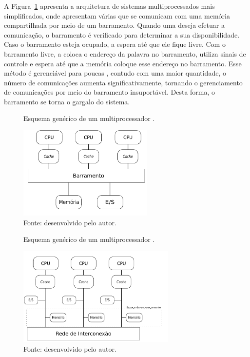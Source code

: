 A Figura~\ref{fig:uma} apresenta a arquitetura de sistemas multiprocessados \uma
mais simplificados, onde apresentam várias \cpus que se
comunicam com uma memória compartilhada por meio de um barramento. Quando uma
\cpu deseja efetuar a comunicação, o barramento é verificado para
determinar a sua disponibilidade. Caso o barramento esteja ocupado, a
\cpu espera até que ele fique livre. Com o barramento livre, a \cpu
coloca o endereço da palavra no barramento, utiliza sinais de
controle e espera até que a memória coloque esse endereço no barramento. Esse
método é gerenciável para poucas \cpus, contudo com uma maior quantidade, o
número de comunicações aumenta significativamente, tornando
o gerenciamento de comunicações por meio do barramento insuportável. Desta
forma, o barramento se torna o gargalo do sistema.

\begin{figure}[b]
	\centering
    \caption{Esquema genérico de um multiprocessador \uma.}
    \includegraphics[width=0.6\textwidth]{figs/multiproc.pdf}
    \caption*{Fonte: desenvolvido pelo autor.}
    \label{fig:uma}
\end{figure}

\begin{figure}[b]
	\centering
    \caption{Esquema genérico de um multiprocessador \numa.}
    \includegraphics[width=0.7\textwidth]{figs/multiprocNUMA.pdf}
    \caption*{Fonte: desenvolvido pelo autor.}
    \label{fig:numa}
\end{figure}


